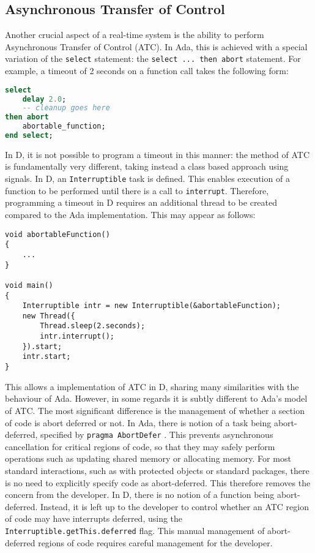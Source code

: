 \subsection{Asynchronous Transfer of Control}
Another crucial aspect of a real-time system is the ability to perform
Asynchronous Transfer of Control (ATC). In Ada, this is achieved with a special
variation of the \texttt{select} statement: the \texttt{select ... then abort}
statement. For example, a timeout of 2 seconds on a function call takes the 
following form: 
\begin{lstlisting}[language=Ada]
select 
    delay 2.0; 
    -- cleanup goes here 
then abort
    abortable_function; 
end select; 
\end{lstlisting}
In D, it is not possible to program a timeout in this manner: the method of ATC
is fundamentally very different, taking instead a class based approach using 
signals. In D, an \texttt{Interruptible} task is defined. This enables
execution of a function to be performed until there is a call to
\texttt{interrupt}. Therefore, programming a timeout in D requires an additional
thread to be created compared to the Ada implementation. This may appear as follows: 
\begin{lstlisting}
void abortableFunction()
{
    ...
}

void main()
{
    Interruptible intr = new Interruptible(&abortableFunction); 
    new Thread({
        Thread.sleep(2.seconds); 
        intr.interrupt(); 
    }).start;
    intr.start; 
}
\end{lstlisting}
This allows a implementation of ATC in D, sharing many similarities with the
behaviour of Ada. However, in some regards it is subtly different to 
Ada's model of ATC. The most significant difference is the management of
whether a section of code is abort deferred or not. In Ada, there is notion of
a task being abort-deferred, specified by \texttt{pragma Abort\textunderscore{}Defer}
\cite{atc-article}.
This prevents asynchronous cancellation for
critical regions of code, so that they may safely perform operations such as
updating shared memory or allocating memory. 
For most standard interactions, such as with protected objects or standard
packages, there is no need to explicitly specify code as abort-deferred. This
therefore removes the concern from the developer. In D, there is no notion of a
function being abort-deferred. Instead, it is left up to the developer to
control whether an ATC region of code may have interrupts deferred, using the 
\texttt{Interruptible.getThis.deferred} flag. This manual management of
abort-deferred regions of code requires careful management for the developer. 

